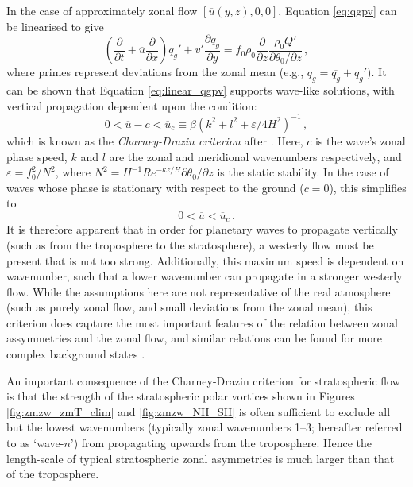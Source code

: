 In the case of approximately zonal flow $[\overline{u}(y,z),0,0]$, Equation
\ref{eq:qgpv} can be linearised to give
\begin{equation}
\left(\frac{\partial}{\partial t} + \overline{u}\frac{\partial}{\partial
    x}\right)q_g' + v'\frac{\partial\overline{q_g}}{\partial y} = f_0\rho_0 \frac{\partial}{\partial z}
\frac{\rho_0Q'}{\partial\theta_{0}/\partial z} \, ,
\label{eq:linear_qgpv} 
\end{equation}
where primes represent deviations from the zonal mean (e.g., $q_g =
\overline{q_g} + q_g'$). It can be shown that Equation \ref{eq:linear_qgpv}
supports wave-like solutions, with vertical propagation dependent upon the
condition:
\begin{equation}
0 < \overline{u}-c < \overline{u}_c \equiv \beta(k^2+l^2+\varepsilon/4H^2)^{-1} \,,
\end{equation}
which is known as the \emph{Charney-Drazin criterion} after
\citet{Charney1961}. Here, $c$ is the wave's zonal phase speed, $k$ and $l$ are
the zonal and meridional wavenumbers respectively, and $\varepsilon = f_0^2/N^2$,
where $N^2 = H^{-1}Re^{-\kappa z/H}\partial\theta_0/\partial z$ is the static
stability. In the case of waves whose phase is stationary with respect to the
ground ($c=0$), this simplifies to
\begin{equation}
0 < \overline{u} < \overline{u}_c\, . 
\label{eq:charney-drazin}
\end{equation}
It is therefore apparent that in order for planetary waves to propagate
vertically (such as from the troposphere to the stratosphere), a westerly flow
must be present that is not too strong. Additionally, this maximum speed is
dependent on wavenumber, such that a lower wavenumber can propagate in a
stronger westerly flow. While the assumptions here are not representative of the
real atmosphere (such as purely zonal flow, and small deviations from the zonal
mean), this criterion does capture the most important features of the relation
between zonal assymmetries and the zonal flow, and similar relations can be
found for more complex background states \citep{Andrews1987}.

An important consequence of the Charney-Drazin criterion for stratospheric flow
is that the strength of the stratospheric polar vortices shown in Figures
\ref{fig:zmzw_zmT_clim} and \ref{fig:zmzw_NH_SH} is often sufficient to exclude
all but the lowest wavenumbers (typically zonal wavenumbers 1--3; hereafter
referred to as `wave-$n$') from propagating upwards from the troposphere. Hence
the length-scale of typical stratospheric zonal asymmetries is much larger than
that of the troposphere.

